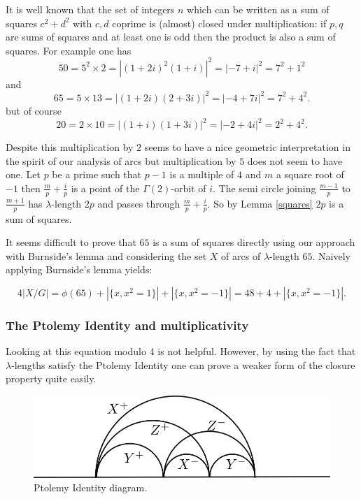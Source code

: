 \documentclass[12pt,a4paper]{amsart}
\def\g2{\Gamma(2)}
\begin{document}
It is well known that the set of integers $n$ 
which can be written as a sum of squares 
$c^2 + d^2$ with $c,d$ coprime is (almost) closed under
multiplication:
if $p,q$ are sums of squares and at least one is odd then the
product is also a sum of squares. 
For example one has
$$50 = 5^2 \times 2 = | (1+2i)^2 (1+i) |^2 = |  -7 + i |^2 = 7^2 + 1^2 $$
and
$$65 = 5 \times 13 = | (1+2i)(2+3 i) |^2 = |  -4 + 7i |^2 = 7^2 + 4^2.$$
but of course 
$$ 20 = 2 \times 10= |(1 + i)(1+ 3i)|^2 = | -2 + 4i |^2 = 2^2 + 4^2.$$

Despite this multiplication by $2$ seems to have a nice geometric interpretation
in the spirit of our analysis of arcs but multiplication by $5$
does not seem to have one.
Let $p$ be a prime such that $p-1$ is a multiple of $4$
and $m$ a square root of $-1$ then 
$\frac{m}{p} + \frac{i}{p}$
is a point of the $\g2$-orbit of $i$.
The semi circle joining $\frac{m-1}{p}$ to  $\frac{m+1}{p}$
has $\lambda$-length $2p$
and passes through 
$\frac{m}{p} + \frac{i}{p}$.
So by Lemma \ref{squares} $2p$ is a sum of squares.

It seems difficult to prove that $65$ is a sum of squares directly
using our approach with Burnside's lemma and considering  the set
$X$ of arcs of $\lambda$-length $65$. Naively applying Burnside's
lemma yields:

$$4 |X/G|   = \phi(65)+  |\{ x, x^2 = 1 \}| + |\{ x, x^2 = -1 \}| = 48 + 4 +  |\{ x, x^2 = -1 \}|.$$

\subsubsection{The Ptolemy Identity and multiplicativity}


Looking at this equation modulo 4 is not helpful. However, by using
the fact that $\lambda$-lengths satisfy the Ptolemy Identity one can
prove a weaker form of the closure property quite easily.

\begin{figure}[ht]
\begin{center}
\includegraphics[scale=.5]{ptolemy.png} 
\end{center}
\caption{Ptolemy Identity diagram.}
\label{Ptolemy}
\end{figure}
\end{document}
